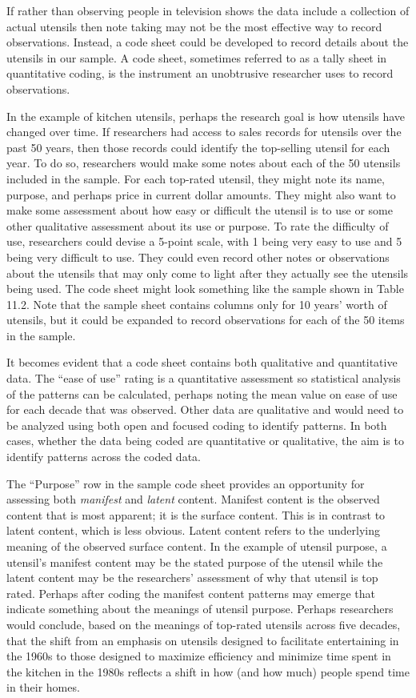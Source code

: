 If rather than observing people in television shows the data include a collection of actual utensils then note taking may not be the most effective way to record observations. Instead, a code sheet could be developed to record details about the utensils in our sample. A code sheet, sometimes referred to as a tally sheet in quantitative coding, is the instrument an unobtrusive researcher uses to record observations.

In the example of kitchen utensils, perhaps the research goal is how utensils have changed over time. If researchers had access to sales records for utensils over the past 50 years, then those records could identify the top-selling utensil for each year. To do so, researchers would make some notes about each of the 50 utensils included in the sample. For each top-rated utensil, they might note its name, purpose, and perhaps price in current dollar amounts. They might also want to make some assessment about how easy or difficult the utensil is to use or some other qualitative assessment about its use or purpose. To rate the difficulty of use, researchers could devise a 5-point scale, with 1 being very easy to use and 5 being very difficult to use. They could even record other notes or observations about the utensils that may only come to light after they actually see the utensils being used. The code sheet might look something like the sample shown in Table 11.2. Note that the sample sheet contains columns only for 10 years' worth of utensils, but it could be expanded to record observations for each of the 50 items in the sample.

It becomes evident that a code sheet contains both qualitative and quantitative data. The ``ease of use'' rating is a quantitative assessment so statistical analysis of the patterns can be calculated, perhaps noting the mean value on ease of use for each decade that was observed. Other data are qualitative and would need to be analyzed using both open and focused coding to identify patterns. In both cases, whether the data being coded are quantitative or qualitative, the aim is to identify patterns across the coded data.

The ``Purpose'' row in the sample code sheet provides an opportunity for assessing both \textit{manifest} and \textit{latent} content. Manifest content is the observed content that is most apparent; it is the surface content. This is in contrast to latent content, which is less obvious. Latent content refers to the underlying meaning of the observed surface content. In the example of utensil purpose, a utensil’s manifest content may be the stated purpose of the utensil while the latent content may be the researchers' assessment of why that utensil is top rated. Perhaps after coding the manifest content patterns may emerge that indicate something about the meanings of utensil purpose. Perhaps researchers would conclude, based on the meanings of top-rated utensils across five decades, that the shift from an emphasis on utensils designed to facilitate entertaining in the 1960s to those designed to maximize efficiency and minimize time spent in the kitchen in the 1980s reflects a shift in how (and how much) people spend time in their homes.

